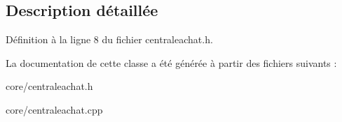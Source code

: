 \subsection{Description détaillée}


Définition à la ligne 8 du fichier centraleachat.h.



La documentation de cette classe a été générée à partir des fichiers suivants :\begin{DoxyCompactItemize}
\item 
core/centraleachat.h\item 
core/centraleachat.cpp\end{DoxyCompactItemize}
